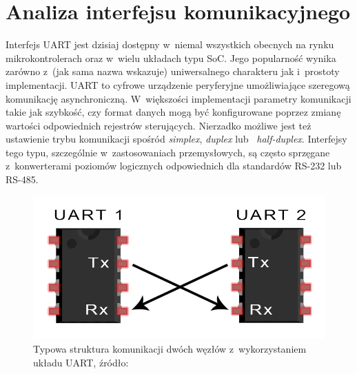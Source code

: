 
\section{Analiza interfejsu komunikacyjnego}

Interfejs UART jest dzisiaj dostępny w~niemal wszystkich obecnych na rynku mikrokontrolerach oraz w~wielu układach typu SoC. Jego popularność wynika zarówno z~(jak sama nazwa wskazuje) uniwersalnego charakteru jak i~prostoty implementacji. UART to cyfrowe urządzenie peryferyjne umożliwiające szeregową komunikację asynchroniczną. W~większości implementacji parametry komunikacji takie jak szybkość, czy format danych mogą być konfigurowane poprzez zmianę wartości odpowiednich rejestrów sterujących. Nierzadko możliwe jest też ustawienie trybu komunikacji spośród \textit{simplex}, \textit{duplex} lub ~\textit{half-duplex}. Interfejsy tego typu, szczególnie w~zastosowaniach przemysłowych, są często sprzęgane z~konwerterami poziomów logicznych odpowiednich dla standardów RS-232 lub RS-485.

\begin{figure}[ht]
    \centering
    \includegraphics[scale=0.5]{img/uart.png}
    \captionsetup{format=plain,justification=centering}
    \caption{Typowa struktura komunikacji dwóch węzłów z~wykorzystaniem układu UART, źródło: \cite{uart}}
    \label{uart}
\end{figure}

